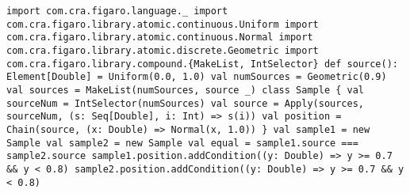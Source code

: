\begin{flushleft}
\texttt{import com.cra.figaro.language.\_
\newline import com.cra.figaro.library.atomic.continuous.Uniform 
\newline import com.cra.figaro.library.atomic.continuous.Normal 
\newline import com.cra.figaro.library.atomic.discrete.Geometric 
\newline import com.cra.figaro.library.compound.\{MakeList, IntSelector\}
\newline 
\newline def source(): Element[Double] = Uniform(0.0, 1.0)
\newline 
\newline val numSources = Geometric(0.9)
\newline 
\newline val sources = MakeList(numSources, source \_)
\newline 
\newline class Sample \{
\newline \tab val sourceNum = IntSelector(numSources)
\newline \tab val source =
\newline \tab Apply(sources, sourceNum, (s: Seq[Double], i: Int) => s(i))
\newline \tab val position =
\newline \tab Chain(source, (x: Double) => Normal(x, 1.0))
\newline \}
\newline 
\newline val sample1 = new Sample 
\newline val sample2 = new Sample
\newline 
\newline val equal = sample1.source === sample2.source 
\newline 
\newline sample1.position.addCondition((y: Double) => y >= 0.7 \&\& y < 0.8)
\newline sample2.position.addCondition((y: Double) => y >= 0.7 \&\& y < 0.8) 
}
\end{flushleft}

